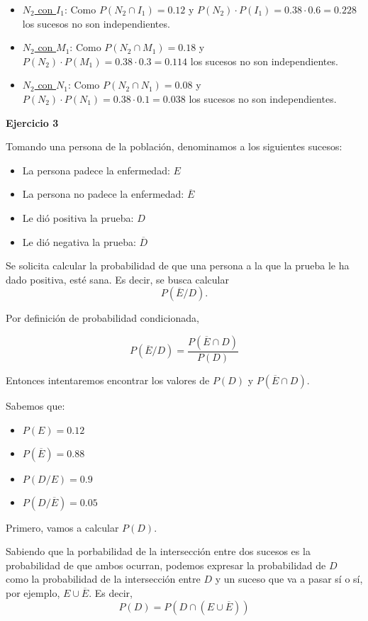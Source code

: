 \documentclass[11pt]{article}
\begin{document}
\begin{itemize}
    \item \underline{$N_{2}$ con $I_{1}$}: Como $P(N_{2}\cap I_{1}) = 0.12$ y $P(N_{2})\cdot P(I_{1}) = 0.38\cdot 0.6 = 0.228$ los sucesos no son independientes. 
    \item \underline{$N_{2}$ con $M_{1}$}: Como $P(N_{2}\cap M_{1}) = 0.18$ y $P(N_{2})\cdot P(M_{1}) = 0.38\cdot 0.3 = 0.114$ los sucesos no son independientes. 
    \item \underline{$N_{2}$ con $N_{1}$}: Como $P(N_{2}\cap N_{1}) = 0.08$ y $P(N_{2})\cdot P(N_{1}) = 0.38\cdot 0.1 = 0.038$ los sucesos no son independientes. 
\end{itemize}

\textbf{Ejercicio 3}

Tomando una persona de la poblaci\'on, denominamos a los siguientes sucesos: 
\begin{itemize}
    \item La persona padece la enfermedad: $E$
    \item La persona no padece la enfermedad: $\overline{E}$
    \item Le di\'o positiva la prueba: $D$
    \item Le di\'o negativa la prueba: $\overline{D}$
\end{itemize}

Se solicita calcular la probabilidad de que una persona a la que la prueba le ha dado positiva, est\'e sana. Es decir, se busca calcular $$P(\overline{E}/D).$$

Por definici\'on de probabilidad condicionada,

\[P(\overline{E}/D) = \frac{P(\overline{E}\cap D)}{P(D)}\]

Entonces intentaremos encontrar los valores de $P(D)$ y $P(\overline{E} \cap D)$.

Sabemos que: 
\begin{itemize}
    \item $P(E) = 0.12$
    \item $P(\overline{E}) = 0.88$
    \item $P(D/E) = 0.9$
    \item $P(D/\overline{E}) = 0.05$
\end{itemize}

Primero, vamos a calcular $P(D)$.

Sabiendo que la porbabilidad de la intersecci\'on entre dos sucesos es la probabilidad de que ambos ocurran, podemos expresar la probabilidad de $D$ como la probabilidad de la intersecci\'on entre $D$ y un suceso que va a pasar s\'i o s\'i, por ejemplo, $E\cup \overline{E}$. Es decir,
\[P(D) = P(D \cap (E \cup \overline{E}))\]
\end{document}
